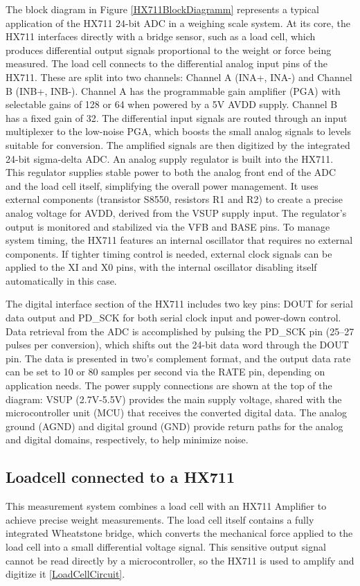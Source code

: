 The block diagram in Figure \ref{HX711BlockDiagramm} represents a typical application of the HX711 24-bit ADC in a weighing scale system. At its core, the HX711 interfaces directly with a bridge sensor, such as a load cell, which produces differential output signals proportional to the weight or force being measured. The load cell connects to the differential analog input pins of the HX711. These are split into two channels: Channel A (INA+, INA-) and Channel B (INB+, INB-). Channel A has the programmable gain amplifier (PGA) with selectable gains of 128 or 64 when powered by a 5V AVDD supply. Channel B has a fixed gain of 32. The differential input signals are routed through an input multiplexer to the low-noise PGA, which boosts the small analog signals to levels suitable for conversion. The amplified signals are then digitized by the integrated 24-bit sigma-delta ADC. An analog supply regulator is built into the HX711. This regulator supplies stable power to both the analog front end of the ADC and the load cell itself, simplifying the overall power management. It uses external components (transistor S8550, resistors R1 and R2) to create a precise analog voltage for AVDD, derived from the VSUP supply input. The regulator’s output is monitored and stabilized via the VFB and BASE pins. To manage system timing, the HX711 features an internal oscillator that requires no external components. If tighter timing control is needed, external clock signals can be applied to the XI and X0 pins, with the internal oscillator disabling itself automatically in this case.

The digital interface section of the HX711 includes two key pins: DOUT for serial data output and PD\_SCK for both serial clock input and power-down control. Data retrieval from the ADC is accomplished by pulsing the PD\_SCK pin (25–27 pulses per conversion), which shifts out the 24-bit data word through the DOUT pin. The data is presented in two’s complement format, and the output data rate can be set to 10 or 80 samples per second via the RATE pin, depending on application needs. The power supply connections are shown at the top of the diagram: VSUP (2.7V-5.5V) provides the main supply voltage, shared with the microcontroller unit (MCU) that receives the converted digital data. The analog ground (AGND) and digital ground (GND) provide return paths for the analog and digital domains, respectively, to help minimize noise.


\subsection{Loadcell connected to a HX711}
This measurement system combines a load cell with an HX711 Amplifier to achieve precise weight measurements. The load cell itself contains a fully integrated Wheatstone bridge, which converts the mechanical force applied to the load cell into a small differential voltage signal. This sensitive output signal cannot be read directly by a microcontroller, so the HX711 is used to amplify and digitize it \ref{LoadCellCircuit}.

